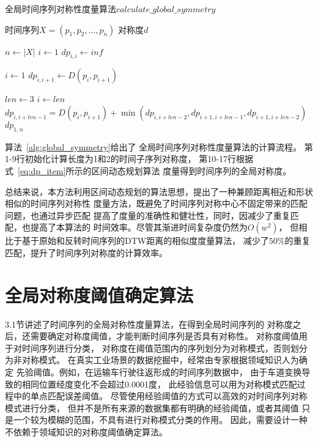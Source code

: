\renewcommand{\algorithmicrequire}{\textbf{输入：}\unskip}
\renewcommand{\algorithmicensure}{\textbf{输出：}\unskip}

\begin{algorithm}
  \caption{全局时间序列对称性度量算法$calculate\_global\_symmetry$}
  \label{alg:global_symmetry}
  \small
  \begin{algorithmic}
    \REQUIRE 时间序列$X=\left(p_{1}, p_{2}, \dots, p_{n}\right)$
    \ENSURE 对称度$d$

    \STATE $n \leftarrow \left|X\right|$
    \STATE $i \leftarrow 1$
    \STATE $dp_{i,i} \leftarrow inf$
    \ENDWHILE

    \STATE $i \leftarrow 1$
    \STATE $dp_{i,i+1} \leftarrow D\left(p_{i}, p_{i+1}\right)$
    \ENDWHILE

    \STATE $len \leftarrow 3$
    \STATE $i \leftarrow len$
    \STATE $dp_{i,i+len-1} = D\left(p_{i}, p_{i+1}\right)+\min \left(dp_{i,i+len-2},dp_{i+1,i+len-1},dp_{i+1,i+len-2}\right)$
    \ENDWHILE
    \ENDWHILE
    \RETURN $dp_{1,n}$
  \end{algorithmic}
\end{algorithm}

算法~\ref{alg:global_symmetry}给出了
全局时间序列对称性度量算法的计算流程。
第1-9行初始化计算长度为1和2的时间子序列对称度，
第10-17行根据式~\ref{eq:dp_item}所示的区间动态规划算法
度量得到时间序列的全局对称度。

总结来说，本方法利用区间动态规划的算法思想，提出了一种兼顾距离相近和形状相似的时间序列对称性
度量方法，既避免了时间序列对称中心不固定带来的匹配问题，也通过异步匹配
提高了度量的准确性和健壮性，同时，因减少了重复匹配，也提高了本算法的
时间效率。尽管其渐进时间复杂度仍然为$O\left(w^{2}\right)$，
但相比于基于原始和反转时间序列的DTW距离的相似度度量算法，
减少了$50 \%$的重复匹配，提升了时间序列对称度的计算效率。

\section{全局对称度阈值确定算法}

3.1节讲述了时间序列的全局对称性度量算法，在得到全局时间序列的
对称度之后，还需要确定对称度阈值，才能判断时间序列是否具有对称性。
对称度阈值用于对时间序列进行分类，
对称度在阈值范围内的序列划分为对称模式，否则划分为非对称模式。
在真实工业场景的数据挖掘中，经常由专家根据领域知识人为确定
先验阈值。例如，在运输车行驶往返形成的时间序列数据中，
由于车道变换导致的相同位置经度变化不会超过0.0001度，
此经验信息可以用为对称模式匹配过程中的单点匹配误差阈值。
尽管使用经验阈值的方式可以高效的对时间序列对称模式进行分类，
但并不是所有来源的数据集都有明确的经验阈值，或者其阈值
只是一个较为模糊的范围，不具有进行对称模式分类的作用。
因此，需要设计一种不依赖于领域知识的对称度阈值确定算法。

